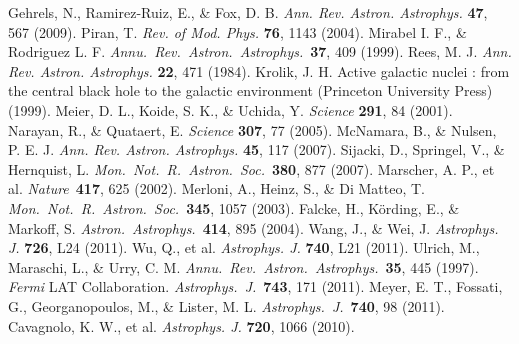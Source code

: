 \documentclass[12pt]{article}
\def\aap{{\it Astron.~Astrophys.}~}
\def\apj{{\it Astrophys.~J.}~}
\def\araa{{\it Annu.~Rev.~Astron.~Astrophys.}~}
\def\mnras{{\it Mon.~Not.~R.~Astron.~Soc.}~}
\def\nat{{\it Nature}~}
\begin{document}
\clearpage

\begin{thebibliography}{1}
 Gehrels, N., Ramirez-Ruiz, E., \& Fox, D. B. \emph{Ann. Rev. Astron. Astrophys.} \textbf{47}, 567 (2009).	
 Piran, T.  \emph{Rev. of Mod. Phys.} \textbf{76}, 1143 (2004).	
 Mirabel I. F., \& Rodriguez L. F. \araa 	\textbf{37}, 409 (1999).	
 Rees, M. J. \emph{Ann. Rev. Astron. Astrophys.} \textbf{22}, 471	(1984).	
 Krolik, J. H. Active galactic nuclei : from the central black hole to the galactic
environment (Princeton University Press) (1999).	
 Meier, D. L., Koide, S. K., \& Uchida, Y.  \emph{Science} \textbf{291}, 84 (2001).	
 Narayan, R., \& Quataert, E. \emph{Science} \textbf{307}, 77 (2005).	
 McNamara, B., \& Nulsen, P. E. J. \emph{Ann. Rev. Astron. Astrophys.} \textbf{45}, 117 (2007).		
 Sijacki, D., Springel, V., \& Hernquist, L. \mnras \textbf{380}, 877 (2007).		
 Marscher, A. P., et al.  \nat \textbf{417}, 625 (2002).	
 Merloni, A., Heinz, S., \& Di Matteo, T.  \mnras \textbf{345}, 1057 (2003).	
 Falcke, H., K\"ording, E., \& Markoff, S. \aap 	\textbf{414}, 895 (2004).	
 Wang, J., \& Wei, J. \emph{Astrophys. J.} \textbf{726}, L24 (2011).		
 Wu, Q., et al. \emph{Astrophys. J.} \textbf{740}, L21 (2011).		
 Ulrich, M., Maraschi, L., \& Urry, C. M. \araa \textbf{35}, 445 (1997). 
%
 \emph{Fermi} LAT Collaboration. \apj \textbf{743}, 171 (2011).		
 Meyer, E. T., Fossati, G., Georganopoulos, M., \& Lister, M. L. \apj \textbf{740}, 98 (2011).		
 Cavagnolo, K. W., et al. \emph{Astrophys. J.} \textbf{720}, 1066 (2010).	

\end{thebibliography}
\end{document}
